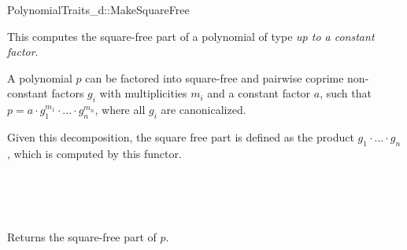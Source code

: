 \begin{ccRefConcept}{PolynomialTraits_d::MakeSquareFree}
\ccDefinition

This  computes the square-free part of 
a polynomial of type   
{\em up to a constant factor}.  

A polynomial $p$ can be  factored into square-free and pairwise coprime 
non-constant factors $g_i$ with multiplicities $m_i$ and a constant factor $a$, 
such that $p = a  \cdot  g_1^{m_1}  \cdot  ...  \cdot  g_n^{m_n}$, where all $g_i$ are canonicalized.

Given this decomposition, the square free part is defined as the product $g_1  \cdot  ...  \cdot  g_n$, 
which is computed by this functor. 

\ccRefines 
{}\\
\\
\\

\ccTypes

\ccGlue
{}

\ccOperations
{}
         { Returns the square-free part of $p$.}



\ccSeeAlso

\\
\\
\\
\\
\\

\end{ccRefConcept}
